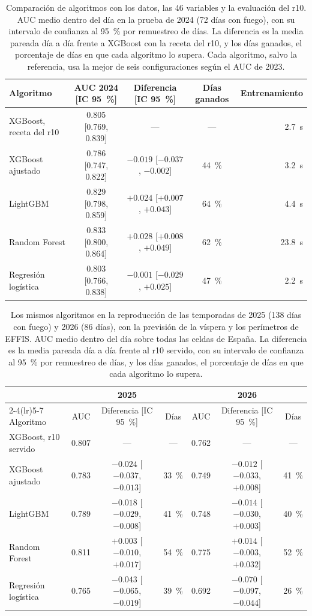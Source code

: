 \begin{table}[H]
\centering
\small
\caption{Comparación de algoritmos con los datos, las 46 variables y la evaluación del r10. AUC medio dentro del día en la prueba de 2024 (72 días con fuego), con su intervalo de confianza al 95~\% por remuestreo de días. La diferencia es la media pareada día a día frente a XGBoost con la receta del r10, y los días ganados, el porcentaje de días en que cada algoritmo lo supera. Cada algoritmo, salvo la referencia, usa la mejor de seis configuraciones según el AUC de 2023.}
\label{tab:algoritmos}
\begin{tabular}{lcccr}
\toprule
Algoritmo & AUC 2024 [IC 95~\%] & Diferencia [IC 95~\%] & Días ganados & Entrenamiento \\
\midrule
XGBoost, receta del r10 & 0.805 [0.769, 0.839] & --- & --- & 2.7~s \\
XGBoost ajustado & 0.786 [0.747, 0.822] & $-0.019$ [$-0.037$, $-0.002$] & 44~\% & 3.2~s \\
LightGBM & 0.829 [0.798, 0.859] & $+0.024$ [$+0.007$, $+0.043$] & 64~\% & 4.4~s \\
Random Forest & 0.833 [0.800, 0.864] & $+0.028$ [$+0.008$, $+0.049$] & 62~\% & 23.8~s \\
Regresión logística & 0.803 [0.766, 0.838] & $-0.001$ [$-0.029$, $+0.025$] & 47~\% & 2.2~s \\
\bottomrule
\end{tabular}
\end{table}

\begin{table}[H]
\centering
\small
\caption{Los mismos algoritmos en la reproducción de las temporadas de 2025 (138 días con fuego) y 2026 (86 días), con la previsión de la víspera y los perímetros de EFFIS. AUC medio dentro del día sobre todas las celdas de España. La diferencia es la media pareada día a día frente al r10 servido, con su intervalo de confianza al 95~\% por remuestreo de días, y los días ganados, el porcentaje de días en que cada algoritmo lo supera.}
\label{tab:algoritmos-temporadas}
\setlength{\tabcolsep}{4pt}
\begin{tabular}{lcccccc}
\toprule
 & \multicolumn{3}{c}{2025} & \multicolumn{3}{c}{2026} \\
\cmidrule(lr){2-4}\cmidrule(lr){5-7}
Algoritmo & AUC & Diferencia [IC 95~\%] & Días & AUC & Diferencia [IC 95~\%] & Días \\
\midrule
XGBoost, r10 servido & 0.807 & --- & --- & 0.762 & --- & --- \\
XGBoost ajustado & 0.783 & $-0.024$ [$-0.037$, $-0.013$] & 33~\% & 0.749 & $-0.012$ [$-0.033$, $+0.008$] & 41~\% \\
LightGBM & 0.789 & $-0.018$ [$-0.029$, $-0.008$] & 41~\% & 0.748 & $-0.014$ [$-0.030$, $+0.003$] & 40~\% \\
Random Forest & 0.811 & $+0.003$ [$-0.010$, $+0.017$] & 54~\% & 0.775 & $+0.014$ [$-0.003$, $+0.032$] & 52~\% \\
Regresión logística & 0.765 & $-0.043$ [$-0.065$, $-0.019$] & 39~\% & 0.692 & $-0.070$ [$-0.097$, $-0.044$] & 26~\% \\
\bottomrule
\end{tabular}
\end{table}
